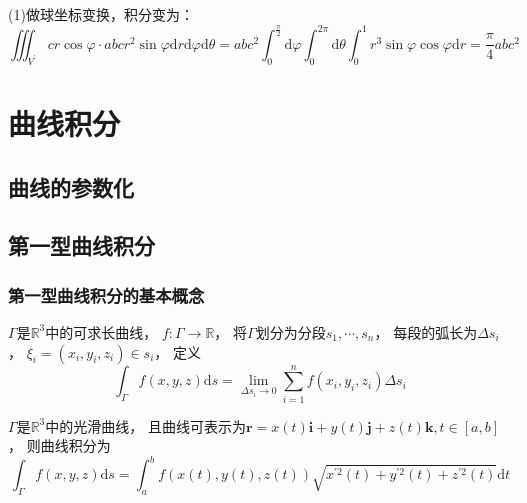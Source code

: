 \begin{solution}
  (1)做球坐标变换，积分变为：
  \begin{equation*}
    \iiint_{V^{\prime}} cr\cos \varphi \cdot abcr^2 \sin \varphi \mathrm{d} r \mathrm{d} \varphi \mathrm{d} \theta = abc^2 \int_0^{\frac{\pi}{2}}\mathrm{d} \varphi \int_0^{2\pi} \mathrm{d} \theta \int_0^1 r^3 \sin \varphi \cos \varphi \mathrm{d} r = \frac{\pi}{4}abc^2
   \end{equation*}
\end{solution}


\newpage

\chapter{曲线积分}

\section{曲线的参数化}




\section{第一型曲线积分}

\subsection{第一型曲线积分的基本概念}

\begin{definition}[第一型曲线积分]
  $\Gamma$是$\mathbb{R}^3$中的可求长曲线，
  $f: \Gamma \rightarrow \mathbb{R}$，
  将$\Gamma$划分为分段$s_1,\cdots,s_n$，
  每段的弧长为$\Delta s_i$，
  $\xi_i = (x_i,y_i,z_i) \in s_i$，
  定义
  \begin{equation*}
    \int _{\Gamma}f(x,y,z)\mathrm{d}s = \lim \limits _{\Delta s_i \rightarrow 0} \sum\limits_{i = 1}^n f(x_i,y_i,z_i) \Delta s_i 
  \end{equation*}
\end{definition}

\begin{theorem}[第一型曲线积分的计算]
  $\Gamma$是$\mathbb{R}^3$中的光滑曲线，
  且曲线可表示为$\mathbf{r} = x(t)\mathbf{i} + y(t)\mathbf{j} + z(t)\mathbf{k}, t \in [a,b]$，
  则曲线积分为
  \begin{equation*}
    \int _{\Gamma}f(x,y,z) \mathrm{d}s = \int^b_af(x(t),y(t),z(t)) \sqrt{x^{\prime 2}(t) + y^{\prime 2}(t) + z^{\prime 2}(t)}\mathrm{d}t 
  \end{equation*}
\end{theorem}

